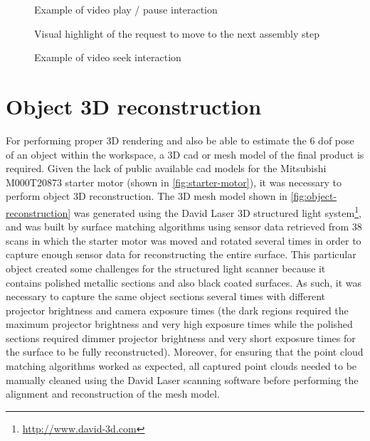 \vspace{-0.7em}
\begin{figure}[ht]
	\begin{floatrow}[3]
		{\caption{Example of video play / pause interaction}\label{fig:interaction-pause}\vspace{-0.5em}}
		\hspace{0.01em}
		{\caption{Visual highlight of the request to move to the next assembly step}\label{fig:interaction-next}\vspace{-0.5em}}
		\hspace{0.01em}
		{\caption{Example of video seek interaction}\label{fig:interaction-seek}\vspace{-0.5em}}
	\end{floatrow}
\end{figure}
\vspace{-0.3em}


\section{Object 3D reconstruction}\label{sec:object-reconstruction}

For performing proper 3D rendering and also be able to estimate the 6 \gls{dof} pose of an object within the workspace, a 3D \gls{cad} or mesh model of the final product is required. Given the lack of public available \gls{cad} models for the Mitsubishi M000T20873 starter motor (shown in \cref{fig:starter-motor}), it was necessary to perform object 3D reconstruction. The 3D mesh model shown in \cref{fig:object-reconstruction} was generated using the David Laser 3D structured light system\footnote{\url{http://www.david-3d.com}}, and was built by surface matching algorithms using sensor data retrieved from 38 scans in which the starter motor was moved and rotated several times in order to capture enough sensor data for reconstructing the entire surface. This particular object created some challenges for the structured light scanner because it contains polished metallic sections and also black coated surfaces. As such, it was necessary to capture the same object sections several times with different projector brightness and camera exposure times (the dark regions required the maximum projector brightness and very high exposure times while the polished sections required dimmer projector brightness and very short exposure times for the surface to be fully reconstructed). Moreover, for ensuring that the point cloud matching algorithms worked as expected, all captured point clouds needed to be manually cleaned using the David Laser scanning software before performing the alignment and reconstruction of the mesh model.

